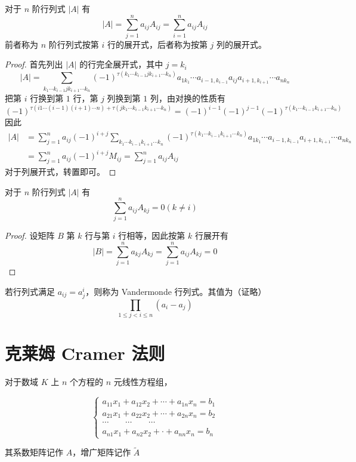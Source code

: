 \begin{theorem}
	对于 $n$ 阶行列式 $|A|$ 有
	\[|A| = \sum_{j=1}^na_{ij}A_{ij} = \sum_{i=1}^na_{ij}A_{ij}\]
	前者称为 $n$ 阶行列式按第 $i$ 行的展开式，后者称为按第 $j$ 列的展开式。
\end{theorem}

\begin{proof}
	首先列出 $|A|$ 的行完全展开式，其中 $j=k_i$
	\[|A|=\sum_{k_1\cdots k_{i-1}jk_{i+1}\cdots k_n}(-1)^{\tau(k_1\cdots k_{i-1}jk_{i+1}\cdots k_n)}a_{1k_1}\cdots a_{i-1,k_{i-1}}a_{ij}a_{i+1,k_{i+1}}\cdots a_{nk_n}\]
	把第 $i$ 行换到第 $1$ 行，第 $j$ 列换到第 $1$ 列，由对换的性质有
	\[(-1)^{\tau(i1\cdots (i-1)(i+1)\cdots n)+\tau(jk_1\cdots k_{i-1}k_{i+1}\cdots k_n)}=(-1)^{i-1}(-1)^{j-1}(-1)^{\tau(k_1\cdots k_{i-1}k_{i+1}\cdots k_n)}\]
	因此
	\begin{equation*}
		\begin{aligned}
			|A|&=\sum_{j=1}^na_{ij}(-1)^{i+j}\sum_{k_1\cdots k_{i-1}k_{i+1}\cdots k_n}(-1)^{\tau(k_1\cdots k_{i-1}k_{i+1}\cdots k_n)}a_{1k_1}\cdots a_{i-1,k_{i-1}}a_{i+1,k_{i+1}}\cdots a_{nk_n}\\
			&=\sum_{j=1}^na_{ij}(-1)^{i+j}M_{ij}=\sum_{j=1}^na_{ij}A_{ij}
		\end{aligned}
	\end{equation*}
	对于列展开式，转置即可。
\end{proof}

\begin{theorem}
	对于 $n$ 阶行列式 $|A|$ 有
	\[\sum_{j=1}^na_{ij}A_{kj} = 0(k\ne i)\]
\end{theorem}

\begin{proof}
	设矩阵 $B$ 第 $k$ 行与第 $i$ 行相等，因此按第 $k$ 行展开有
	\[|B|=\sum_{j=1}^na_{kj}A_{kj}=\sum_{j=1}^na_{ij}A_{kj}=0\]
\end{proof}

\begin{definition}
	 若行列式满足 $a_{ij} = a_j^i$，则称为 Vandermonde 行列式。其值为（证略）
	 \[\prod_{1 \leqslant j < i \leqslant n}(a_i-a_j)\]
\end{definition}

\section{克莱姆 Cramer 法则}

对于数域 $K$ 上 $n$ 个方程的 $n$ 元线性方程组，

\begin{equation*}
	\left\{
		\begin{matrix}
			a_{11}x_1+a_{12}x_2+\cdots+a_{1n}x_n=b_1\\
			a_{21}x_1+a_{22}x_2+\cdots+a_{2n}x_n=b_2\\
			\cdots\qquad\cdots\qquad\cdots\\
			a_{n1}x_1+a_{n2}x_2+\cdot +a_{nn}x_n=b_n
		\end{matrix}
	\right.
\end{equation*}

其系数矩阵记作 $A$，增广矩阵记作 $\widetilde{A}$ 